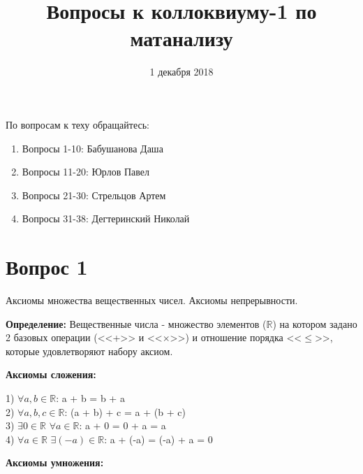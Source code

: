 \documentclass{article}
\title{Вопросы к коллоквиуму-1 по матанализу}
\author{}
\date{1 декабря 2018}
\DeclareMathOperator{\Exists}{\exists}
\begin{document}
\normalsize
\maketitle
\setcounter{section}{20}
 
\begin{center}
    По вопросам к теху обращайтесь:
    \begin{enumerate}
        \item Вопросы 1-10: Бабушанова Даша
        \item Вопросы 11-20: Юрлов Павел
        \item Вопросы 21-30: Стрельцов Артем
        \item Вопросы 31-38: Дегтеринский Николай
    \end{enumerate}
\end{center}
 
 
\section*{Вопрос 1}
   
\begin{center}
    Аксиомы множества вещественных чисел. Аксиомы непрерывности.
\end{center}
 
   \textbf{Определение: }Вещественные числа - множество элементов ($\mathbb{R}$) на котором задано 2 базовых операции (<<+>> и <<$\times$>>) и отношение порядка <<$\leqslant$>>, которые удовлетворяют набору аксиом.
\begin{center}
   
\end{center}
 
\begin{center}
   \textbf{Аксиомы сложения:}
\end{center}
 
\begin{center}
       1) $\forall a,b \in \mathbb{R}$: a + b = b + a \\
       2) $\forall a,b,c \in \mathbb{R}$: (a + b) + c = a + (b + c) \\
       3) $\Exists 0 \in \mathbb{R} $ $ \forall a \in \mathbb{R}$: a + 0 = 0 + a = a \\
       4) $\forall a \in \mathbb{R} $ $ \Exists (-a) \in \mathbb{R}$: a + (-a) = (-a) + a = 0\\
\end{center}
 
\begin{center}
   \textbf{Аксиомы умножения:}
\end{center}
 
\end{document}
